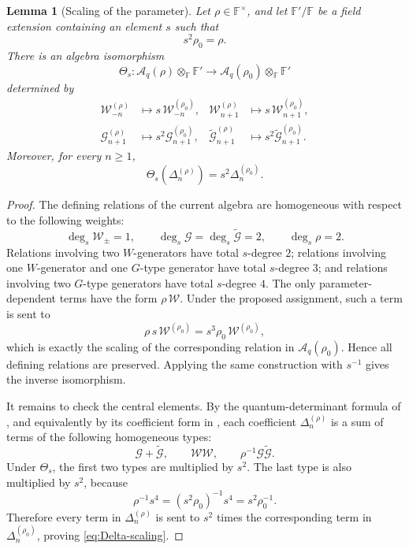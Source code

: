 \documentclass[11pt]{extarticle}
\newtheorem{lemma}[theorem]{Lemma}
\theoremstyle{definition}
\theoremstyle{remark}
\numberwithin{equation}{section}
\newcommand{\F}{\mathbb F}
\newcommand{\Aq}{\mathcal A_q}
\newcommand{\cW}{\mathcal W}
\newcommand{\cG}{\mathcal G}
\newcommand{\ctG}{\widetilde{\mathcal G}}
\begin{document}
\begin{lemma}[Scaling of the parameter]
\label{lem:rho-scaling}
Let \(\rho\in\F^\times\), and let \(\F'/\F\) be a field extension containing
an element \(s\) such that
\[
        s^2\rho_0=\rho .
\]
There is an algebra isomorphism
\[
\Theta_s:
\Aq(\rho)\otimes_\F\F'
\longrightarrow
\Aq(\rho_0)\otimes_\F\F'
\]
determined by
\begin{align*}
\cW_{-n}^{(\rho)}&\longmapsto s\,\cW_{-n}^{(\rho_0)},
&
\cW_{n+1}^{(\rho)}&\longmapsto s\,\cW_{n+1}^{(\rho_0)},\\
\cG_{n+1}^{(\rho)}&\longmapsto s^2\cG_{n+1}^{(\rho_0)},
&
\ctG_{n+1}^{(\rho)}&\longmapsto s^2\ctG_{n+1}^{(\rho_0)}.
\end{align*}
Moreover, for every \(n\geq1\),
\begin{equation}
\label{eq:Delta-scaling}
        \Theta_s(\Delta_n^{(\rho)})
        =
        s^2\Delta_n^{(\rho_0)} .
\end{equation}
\end{lemma}

\begin{proof}
The defining relations of the current algebra are homogeneous with respect
to the following weights:
\[
        \deg_s\cW_{\pm}=1,
        \qquad
        \deg_s\cG=\deg_s\ctG=2,
        \qquad
        \deg_s\rho=2.
\]
Relations involving two \(W\)-generators have total \(s\)-degree \(2\);
relations involving one \(W\)-generator and one \(G\)-type generator have
total \(s\)-degree \(3\); and relations involving two \(G\)-type generators
have total \(s\)-degree \(4\).  The only parameter-dependent terms have the
form \(\rho\,\cW\).  Under the proposed assignment, such a term is sent to
\[
        \rho\,s\,\cW^{(\rho_0)}
        =
        s^3\rho_0\,\cW^{(\rho_0)},
\]
which is exactly the scaling of the corresponding relation in
\(\Aq(\rho_0)\).  Hence all defining relations are preserved.  Applying the
same construction with \(s^{-1}\) gives the inverse isomorphism.

It remains to check the central elements.  By the quantum-determinant
formula of \cite[Proposition~2.1]{BaseilhacBelliard2017}, and equivalently
by its coefficient form in \cite[Lemma~2.1]{BaseilhacBelliard2017}, each
coefficient \(\Delta_n^{(\rho)}\) is a sum of terms of the following
homogeneous types:
\[
        \cG+\ctG,\qquad
        \cW\cW,\qquad
        \rho^{-1}\cG\ctG .
\]
Under \(\Theta_s\), the first two types are multiplied by \(s^2\).  The last
type is also multiplied by \(s^2\), because
\[
        \rho^{-1}s^4
        =
        (s^2\rho_0)^{-1}s^4
        =
        s^2\rho_0^{-1}.
\]
Therefore every term in \(\Delta_n^{(\rho)}\) is sent to \(s^2\) times the
corresponding term in \(\Delta_n^{(\rho_0)}\), proving
\eqref{eq:Delta-scaling}.
\end{proof}
\end{document}
